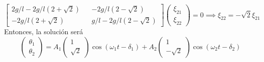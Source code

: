 \[\left[\begin{matrix}
    2g/l-2g/l(2+\sqrt{2}) && -2g/l(2-\sqrt{2}) \\ -2g/l(2+\sqrt{2}) && g/l-2g/l(2-\sqrt{2})
\end{matrix}\right] \left(\begin{matrix}
    \xi_{21} \\ \xi_{22}
\end{matrix}\right) = 0 \implies \xi_{22} = -\sqrt{2}\xi_{21}\]
Entonces, la solución será
\[\left(\begin{matrix}
    \theta_1 \\ \theta_2
\end{matrix}\right) = A_1 \left(\begin{matrix}
    1 \\ \sqrt{2}
\end{matrix}\right) \cos{(\omega_1 t -\delta_1)}+A_2 \left(\begin{matrix}
    1 \\ -\sqrt{2}
\end{matrix}\right) \cos{(\omega_2 t -\delta_2)}\]
